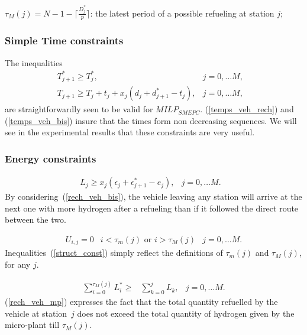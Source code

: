 \documentclass[11pt]{article}
\theoremstyle{plain}%
\theoremstyle{definition} \newtheorem{lem}{Lemma}[section]
\theoremstyle{definition} \newtheorem{claim}{Claim}[lem]
\theoremstyle{definition} \newtheorem{theorem}{Theorem}[section]
\theoremstyle{definition} \newtheorem{exo}{Exercice n$^\circ$}
\theoremstyle{definition} \newtheorem{quest}{}[exo]
\theoremstyle{definition} \newtheorem{sousquest}{}[quest]
\theoremstyle{remark}
\theoremstyle{definition}
\begin{document}
$\tau_M(j)= N-1 - \lceil \frac{D^*_j}{p} \rceil$: the latest period of a possible refueling at  station $j$;
%
\subsubsection{Simple Time constraints}
The inequalities
\begin{eqnarray}
 T_{j+1}^* \geq T_j^*  , & j=0,\ldots M, & \label{temps_veh_rech} \\
 T_{j+1} \geq T_j + t_j + x_j (d_j +d^*_{j+1} - t_j),& j=0,\ldots M, &\label{temps_veh_bis}
\end{eqnarray}
are straightforwardly seen to be valid for $MILP_{SMEPC}$. 
(\ref{temps_veh_rech}) and  (\ref{temps_veh_bis})
insure that the times form  non decreasing sequences. 
We will see in the experimental results that these constraints are very useful.

%
\subsubsection{Energy constraints}

\begin{eqnarray}
 L_j \geq x_j (\epsilon_j +\epsilon_{j+1}^* - e_j) ,&  j=0, \ldots M. & \label{rech_veh_bis} 
\end{eqnarray}
By considering~(\ref{rech_veh_bis}), the vehicle leaving any station
will arrive at the next one with more hydrogen after a refueling than if it  followed the direct route between the two.

\begin{eqnarray}
 U_{i, j }  = 0  &  i< \tau_m(j) \textrm{ or } i > \tau_M(j) & j=0, \ldots M.  \label{struct_const} 
\end{eqnarray}
Inequalities~(\ref{struct_const}) simply reflect the definitions of $\tau_m(j)$ and $\tau_M(j)$, for any $j$.


\begin{eqnarray}
 \sum_{i=0}^{\tau_M(j)} L_i^*   \geq  & \sum_{k=0}^{j} L_k  ,&  j=0, \ldots M.  \label{rech_veh_mp} 
\end{eqnarray}
(\ref{rech_veh_mp}) expresses the fact that the total quantity refuelled by the vehicle at station~$j$ does not exceed the
total quantity of hydrogen given by the micro-plant till $\tau_M(j)$.
\end{document}
